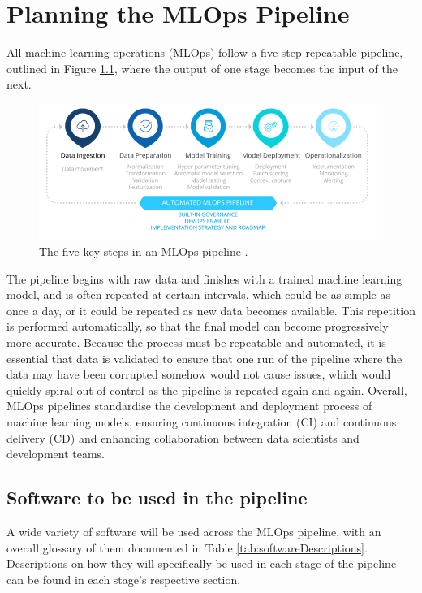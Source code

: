 \documentclass[12pt]{report}
\begin{document}
\chapter{Planning the MLOps Pipeline}\label{ch:PlanMLOps}
All machine learning operations (MLOps) follow a five-step repeatable pipeline, outlined in Figure \ref{fig:MLPipeline}, where the output of one stage
becomes the input of the next. 
\begin{figure}[H]
    \centering
    \includegraphics[width=.75\linewidth]{MLPipeline.png}
    \caption{The five key steps in an MLOps pipeline \autocite{incycle_software_mlops_nodate}.}
    \label{fig:MLPipeline}
\end{figure}
The pipeline begins with raw data and finishes with a trained machine learning model, and is often 
repeated at certain intervals, which could be as simple as once a day, or it could be repeated as new data becomes available. 
This repetition is performed automatically, so that the final model can become progressively more accurate. Because the process 
must be repeatable and automated, it is essential that data is validated to ensure that one run of the pipeline where the data may have 
been corrupted somehow would not cause issues, which would quickly spiral out of control as the pipeline is repeated again and again.
Overall, MLOps pipelines standardise the development and deployment process of machine learning models, ensuring continuous integration
(CI) and continuous delivery (CD) and enhancing collaboration between data scientists and development teams.

\pagebreak

\section{Software to be used in the pipeline}
A wide variety of software will be used across the MLOps pipeline, with an overall glossary of them documented in Table \ref{tab:softwareDescriptions}.
Descriptions on how they will specifically be used in each stage of the pipeline can be found in each stage's respective
section.
\end{document}
